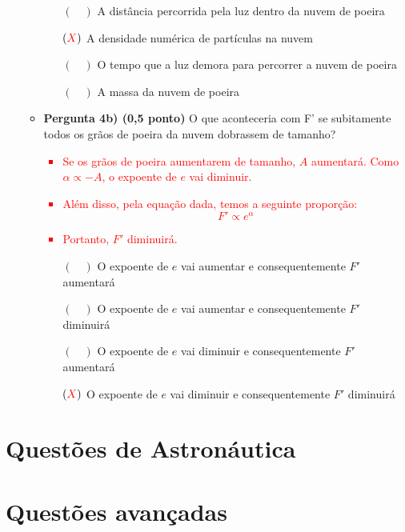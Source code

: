 \documentclass[a4paper, 12pt]{article}
\newcommand{\red}[1]{\textcolor{red}{#1}}
\begin{document}
\begin{flushleft}
\begin{itemize}
\begin{itemize}
                        \begin{itemize}
                            \item[$(\quad)$] A distância percorrida pela luz dentro da nuvem de poeira
                            \item[$(\red{X})$] A densidade numérica de partículas na nuvem
                            \item[$(\quad)$] O tempo que a luz demora para percorrer a nuvem de poeira
                            \item[$(\quad)$] A massa da nuvem de poeira
                        \end{itemize}
                    \item \textbf{Pergunta 4b) (0,5 ponto)} O que aconteceria com F' se subitamente todos os grãos de poeira da nuvem dobrassem de tamanho?
                        \red{\begin{itemize}
                            \item Se os grãos de poeira aumentarem de tamanho, $A$ aumentará. Como $\alpha \propto - A$, o expoente de $e$ vai diminuir.
                            \item Além disso, pela equação dada, temos a seguinte proporção:
                                \begin{equation*}
                                    F' \propto e^\alpha
                                \end{equation*}
                            \item Portanto, $F'$ diminuirá.
                        \end{itemize}}
                        \begin{itemize}
                            \item[$(\quad)$] O expoente de $e$ vai aumentar e consequentemente $F'$ aumentará
                            \item[$(\quad)$] O expoente de $e$ vai aumentar e consequentemente $F'$ diminuirá
                            \item[$(\quad)$] O expoente de $e$ vai diminuir e consequentemente $F'$ aumentará
                            \item[$(\red{X})$] O expoente de $e$ vai diminuir e consequentemente $F'$ diminuirá
                        \end{itemize}
                \end{itemize}
        \end{itemize} \end{flushleft}
    \section*{Questões de Astronáutica}
    \section*{Questões avançadas}
\end{document}
